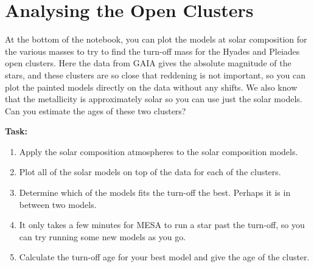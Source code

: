 \documentclass{article}
\begin{document}
\section{Analysing the Open Clusters}

At the bottom of the notebook, you can plot the models at solar composition for the various masses to try to find the turn-off mass for the Hyades and Pleiades open clusters.   Here the data from GAIA gives the absolute magnitude of the stars, and these clusters are so close that reddening is not important, so you can plot the painted models directly on the data without any shifts.  We also know that the metallicity is approximately solar so you can use just the solar models.  Can you estimate the ages of these two clusters?

\textbf{Task:}
\begin{enumerate}
\setlength{\itemsep}{0pt}
\item Apply the solar composition atmospheres to the solar composition models.
\item Plot all of the solar models on top of the data for each of the clusters.  
\item Determine which of the models fits the turn-off the best.  Perhaps it is in between two models.
\item It only takes a few minutes for MESA to run a star past the turn-off, so you can try running some new models as you go.
\item Calculate the turn-off age for your best model and give the age of the cluster.
\end{enumerate}
\end{document}
